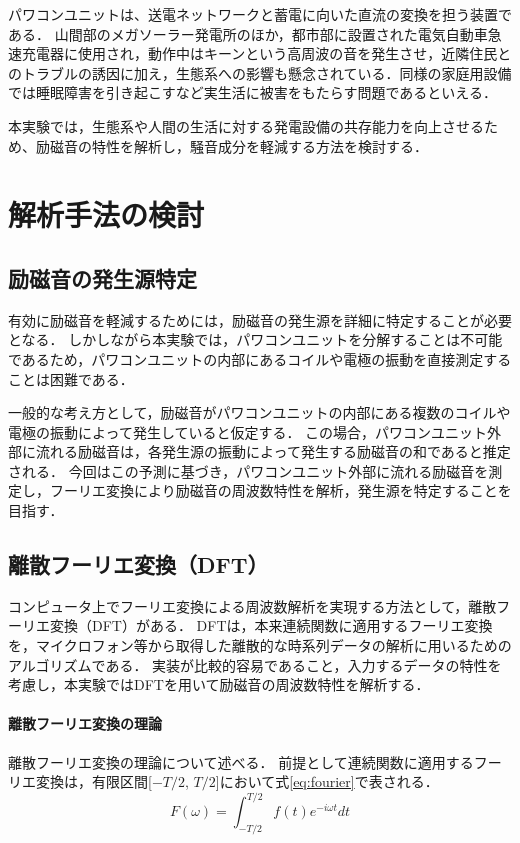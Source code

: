 \documentclass[dvipdfmx,titlepage,a4j]{jsarticle}  %
\begin{document}
パワコンユニットは、送電ネットワークと蓄電に向いた直流の変換を担う装置である．
山間部のメガソーラー発電所のほか，都市部に設置された電気自動車急速充電器に使用され，動作中はキーンという高周波の音を発生させ，近隣住民とのトラブルの誘因に加え，生態系への影響も懸念されている．同様の家庭用設備では睡眠障害を引き起こすなど実生活に被害をもたらす問題であるといえる．

本実験では，生態系や人間の生活に対する発電設備の共存能力を向上させるため、励磁音の特性を解析し，騒音成分を軽減する方法を検討する．

\section{解析手法の検討}
\subsection{励磁音の発生源特定}

有効に励磁音を軽減するためには，励磁音の発生源を詳細に特定することが必要となる．
しかしながら本実験では，パワコンユニットを分解することは不可能であるため，パワコンユニットの内部にあるコイルや電極の振動を直接測定することは困難である．

一般的な考え方として，励磁音がパワコンユニットの内部にある複数のコイルや電極の振動によって発生していると仮定する．
この場合，パワコンユニット外部に流れる励磁音は，各発生源の振動によって発生する励磁音の和であると推定される．
今回はこの予測に基づき，パワコンユニット外部に流れる励磁音を測定し，フーリエ変換により励磁音の周波数特性を解析，発生源を特定することを目指す．

\subsection{離散フーリエ変換（DFT）}
コンピュータ上でフーリエ変換による周波数解析を実現する方法として，離散フーリエ変換（DFT）がある．
DFTは，本来連続関数に適用するフーリエ変換を，マイクロフォン等から取得した離散的な時系列データの解析に用いるためのアルゴリズムである．
実装が比較的容易であること，入力するデータの特性を考慮し，本実験ではDFTを用いて励磁音の周波数特性を解析する．

\paragraph{離散フーリエ変換の理論\\}
離散フーリエ変換の理論について述べる．
前提として連続関数に適用するフーリエ変換は，有限区間[$-T/2$, $T/2$]において式\ref{eq:fourier}で表される．
\begin{equation}
F(\omega) = \int_{-T/2}^{T/2} f(t) e^{-i\omega t} dt
\label{eq:fourier}
\end{equation}
\end{document}
